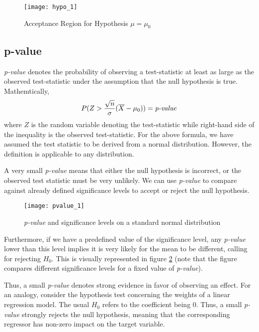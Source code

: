 \documentclass[../probability-notes.tex]{subfiles}
\begin{document}
    \begin{figure}[h]
    \texttt{[image: hypo\_1]}
    \centering
    \caption{Acceptance Region for Hypothesis $\mu=\mu_{0}$}
    \label{fig:hypo_1} %
    \end{figure}

    \subsection{p-value}\label{p_value}
    \emph{p-value} denotes the probability of observing a test-statistic at least as large as the observed test-statistic under the assumption that the null hypothesis is true. Mathemtically,
    \begin{align*}
        P(Z > \frac{\sqrt{n}}{\sigma}(\overline{X} - \mu_{0})) = \text{\emph{p-value}}
    \end{align*}
    where $Z$ is the random variable denoting the test-statistic while right-hand side of the inequality is the observed test-statistic. For the above formula, we have assumed the test statistic to be derived from a normal distribution. However, the definition is applicable to any distribution.\newline

    A very small \emph{p-value} means that either the null hypothesis is incorrect, or the observed test statistic must be very unlikely. We can use \emph{p-value} to compare against already defined significance levels to accept or reject the null hypothesis.

    \begin{figure}[h]
    \texttt{[image: pvalue\_1]}
    \centering
    \caption{\emph{p-value} and significance levels on a standard normal distribution}
    \label{fig:pvalue_1} %
    \end{figure}

    Furthermore, if we have a predefined value of the significance level, any \emph{p-value} lower than this level implies it is very likely for the mean to be different, calling for rejecting $H_{0}$. This is visually represented in figure \ref{fig:pvalue_1} (note that the figure compares different significance levels for a fixed value of \emph{p-value}).\newline

    Thus, a small \emph{p-value} denotes strong evidence in favor of observing an effect. For an analogy, consider the hypothesis test concerning the weights of a linear regression model. The usual $H_{0}$ refers to the coefficient being $0$. Thus, a small \emph{p-value} strongly rejects the null hypothesis, meaning that the corresponding regressor has non-zero impact on the target variable.
\end{document}

